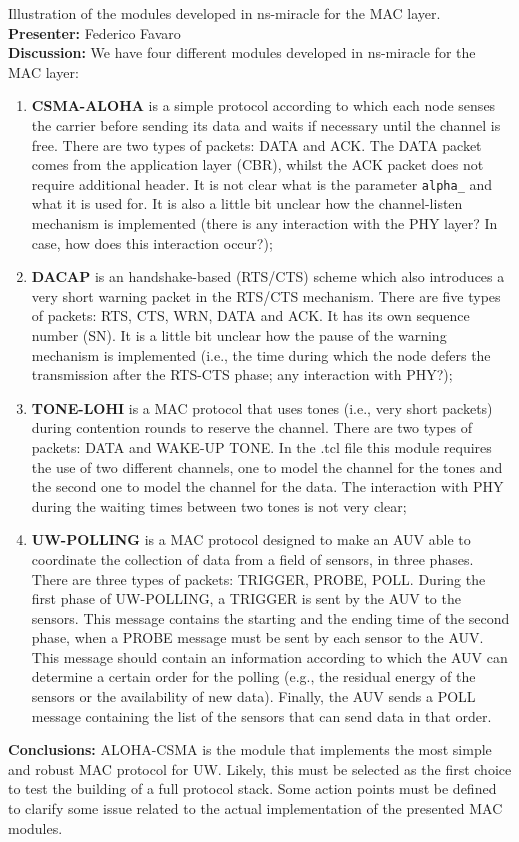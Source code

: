 \documentclass[11pt,journal,draftclsnofoot,onecolumn,twoside,letterpaper]{IEEEtran}
\theoremstyle{definition} \newtheorem{definition}[]{Definition}
\theoremstyle{theorem} \newtheorem{theorem}[]{Theorem}
\begin{document}
 Illustration of the modules developed in ns-miracle for the MAC layer.\\
{\bf Presenter:} Federico Favaro\\
{\bf Discussion:} We have four different modules developed in ns-miracle for the MAC layer:
\begin{enumerate}
 \item {\bf CSMA-ALOHA} is a simple protocol according to which each node senses the carrier before sending its data and waits if necessary
until the channel is free. There are two types of packets: DATA and ACK. The DATA packet comes from the application layer (CBR), whilst the ACK packet does not require additional header. It is not clear what is the parameter {\tt alpha\_} and what it is used for. It is also a little bit unclear how the channel-listen mechanism is implemented (there is any interaction with the PHY layer? In case, how does this interaction occur?); 
 \item {\bf DACAP} is an handshake-based (RTS/CTS) scheme which also introduces a very short warning packet in the RTS/CTS mechanism. There are five types of packets: RTS, CTS, WRN, DATA and ACK. It has its own sequence number (SN). It is a little bit unclear how the pause of the warning mechanism is implemented (i.e., the time during which the node defers the transmission after the RTS-CTS phase; any interaction with PHY?);
 \item {\bf TONE-LOHI} is a MAC protocol that uses tones (i.e., very short packets) during contention rounds to reserve the channel. There are two types of packets: DATA and WAKE-UP TONE. In the .tcl file this module requires the use of two different channels, one to model the channel for the tones and the second one to model the channel for the data. The interaction with PHY during the waiting times between two tones is not very clear;
 \item {\bf UW-POLLING} is a MAC protocol designed to make an AUV able to coordinate the collection of data from a field of sensors, in three phases. There are three types of packets: TRIGGER, PROBE, POLL. During the first phase of UW-POLLING, a TRIGGER is sent by the AUV to the sensors. This message contains the starting and the ending time of the second phase, when a PROBE message must be sent by each sensor to the AUV. This message should contain an information according to which the AUV can determine a certain order for the polling (e.g., the residual energy of the sensors or the availability of new data). Finally, the AUV sends a POLL message containing the list of the sensors that can send data in that order.
\end{enumerate}
{\bf Conclusions:} ALOHA-CSMA is the module that implements the most simple and robust MAC protocol for UW. Likely, this must be selected as the first choice to test the building of a full protocol stack. Some action points must be defined to clarify some issue related to the actual implementation of the presented MAC modules.
\end{document}
